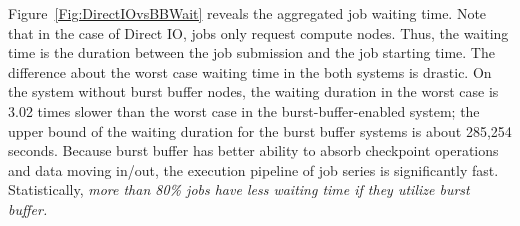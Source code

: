 
Figure~\ref{Fig:DirectIOvsBBWait} reveals the aggregated job waiting time.
Note that in the case of Direct IO, jobs only request compute nodes.
Thus, the waiting time is the duration between the job submission and the job starting time.
The difference about the worst case waiting time in the both systems is drastic.
On the system without burst buffer nodes, the waiting duration in the worst case is 3.02 times
slower than the worst case in the burst-buffer-enabled system;
the upper bound of the waiting duration for the burst buffer systems is about 285,254 seconds.
Because burst buffer has better ability to absorb checkpoint operations and data moving in/out,
the execution pipeline of job series is significantly fast.
Statistically, \textit{more than 80\% jobs have less waiting time if they utilize burst buffer.}


